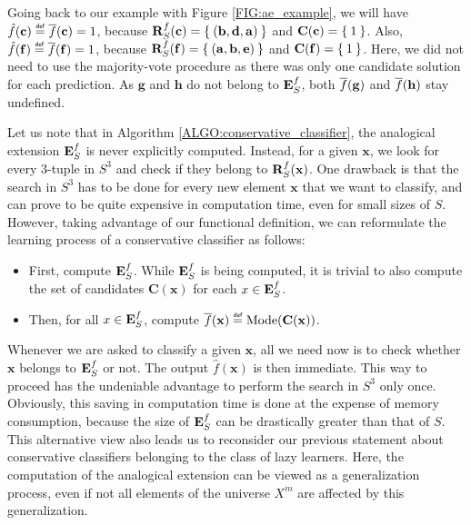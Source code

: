 \begin{testexample}
Going
back to our example with Figure \ref{FIG:ae_example}, we will have
$\hat{f}(\mathbf{c}) \eqdef \albl{\mathbf{c}} = 1$, because
$\mathbf{R}_{S}^{f}(\mathbf{c}) = \Set{(\mathbf{b}, \mathbf{d},\mathbf{a})}$ and
$\mathbf{C}(\mathbf{c}) = \Set{1}$. Also, $\hat{f}(\mathbf{f}) \eqdef
\albl{\mathbf{f}} = 1$, because $\mathbf{R}_{S}^{f}(\mathbf{f}) =
\Set{(\mathbf{a},\mathbf{b},\mathbf{e})}$ and $\mathbf{C}(\mathbf{f}) =
\Set{1}$. Here, we did not need to use the majority-vote procedure as there was
only one candidate solution for each prediction. As $\mathbf{g}$ and
$\mathbf{h}$ do not belong to $\mathbf{E}_{S}^{f}$, both $\overline{f}(\mathbf{g})$ and
$\overline{f}(\mathbf{h})$ stay undefined.
\end{testexample}

Let us note that in Algorithm \ref{ALGO:conservative_classifier}, the
analogical extension $\mathbf{E}_{S}^{f}$ is never explicitly computed. Instead, for a given
$\mathbf{x}$, we look for
every 3-tuple in $S^3$ and check if they belong to $\mathbf{R}_{S}^{f}(\mathbf{x})$. One drawback is
that the search in $S^3$ has to be done for every new element $\mathbf{x}$ that
we want to classify, and can prove to be quite expensive in computation time,
even for small sizes of $S$. However, taking advantage of our functional
definition, we can reformulate the learning process of a conservative
classifier as follows:

\begin{itemize}
\item First, compute $\mathbf{E}_{S}^{f}$. While $\mathbf{E}_{S}^{f}$ is being computed, it is trivial to
  also compute the set of candidates $\mathbf{C}(\mathbf{x})$ for each $x \in
    \mathbf{E}_{S}^{f}$.
  \item Then, for all $x \in\mathbf{E}_{S}^{f}$, compute
    $\albl{\mathbf{x}} \eqdef \text{Mode}(\mathbf{C}(\mathbf{x}))$.
\end{itemize}
\noindent
Whenever we are asked to classify a given $\mathbf{x}$, all we need now is to
check whether $\mathbf{x}$ belongs to $\mathbf{E}_{S}^{f}$ or not. The output
$\hat{f}(\mathbf{x})$ is then immediate. This way to proceed has the undeniable
advantage to perform the search in $S^3$ only once. Obviously, this saving in
computation time is done at the expense of memory consumption, because the
size of $\mathbf{E}_{S}^{f}$ can be drastically greater than that of $S$. This alternative
view also leads us to reconsider our previous statement about conservative
classifiers belonging to the class of lazy learners. Here, the computation of
the analogical extension can be viewed as a generalization process, even if not
all elements of the universe $X^m$ are affected by this generalization.

